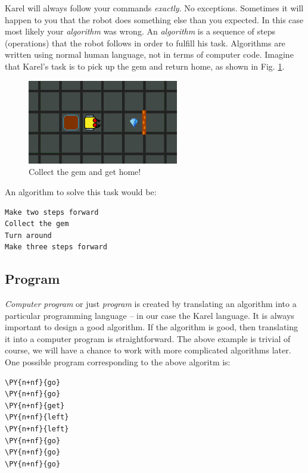 Karel will always follow your commands {\em exactly}. No exceptions. Sometimes it will happen
to you that the robot does something else than you expected.
In this case most likely your {\em algorithm} was wrong. An {\em algorithm} is a sequence of 
steps (operations) that the robot follows in order to fulfill his task. Algorithms 
are written using normal human language, not in terms of computer code. Imagine that Karel's 
task is to pick up the gem and return home, as shown in Fig. \ref{fig:algo-1}.

\begin{figure}[!ht]
\begin{center}
\includegraphics[width=6.6cm]{img/algo-1.png}
\vspace{-0mm}
\caption{Collect the gem and get home!}
\label{fig:algo-1}
\vspace{-1.5cm}
\end{center}
\end{figure}
\newpage
\noindent
An algorithm to solve this task would be:

\begin{verbatim}
Make two steps forward
Collect the gem
Turn around
Make three steps forward
\end{verbatim}

\subsection{Program}

{\em Computer program} or just {\em program} is created by translating an algorithm into a particular 
programming language -- in our case the Karel language. It is always important 
to design a good algorithm. If the algorithm is good, then translating it 
into a computer program is straightforward. The above example is trivial of
course, we will have a chance to work with more complicated algorithms later. 
One possible program corresponding to the above algoritm is:\\

\begin{bbox}
\begin{Verbatim}[commandchars=\\\{\}]
\PY{n+nf}{go}
\PY{n+nf}{go}
\PY{n+nf}{get}
\PY{n+nf}{left}
\PY{n+nf}{left}
\PY{n+nf}{go}
\PY{n+nf}{go}
\PY{n+nf}{go}
\end{Verbatim}
\end{bbox}
\vspace{6mm}

